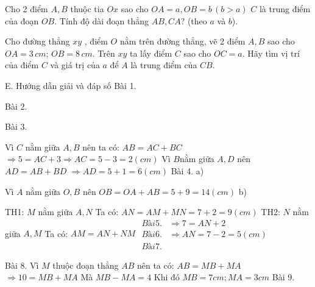\begin{bt}
	Cho 2 điểm $A,B$ thuộc tia  $Ox$  sao cho  $OA=a,OB=b\,(b>a)$ 
	$C$ là trung điểm của đoạn $OB.$  Tính độ dài đoạn thẳng  $AB,CA?$ (theo  $a$  và  $b$).
	\begin{loigiaichuong1}
		
	\end{loigiaichuong1}
\end{bt}
\begin{bt}
	Cho đường thẳng  $xy$ , điểm  $O$  nằm trên đường thẳng, vẽ 2 điểm  $A,B$ sao cho  $OA=3\,cm$; $OB=8\,cm$.  Trên  $xy$  ta lấy điểm  $C$  sao cho  $OC=a$.  Hãy tìm vị trí của điểm  $C$ và giá trị của  $a$  để  $A$  là trung điểm của  $CB$.
	\begin{loigiaichuong1}
		
	\end{loigiaichuong1}
\end{bt}

E. Hướng dẫn giải và đáp số
Bài 1. 



Bài 2. 



Bài 3. 

Vì  $C$ nằm giữa $A,B$ nên ta có: $AB=AC+BC$
$\Rightarrow 5=AC+3\Rightarrow AC=5-3=2\left( cm \right)$
Vì $B$nằm giữa $A,D$ nên $AD=AB+BD$
$\Rightarrow AD=5+1=6\left( cm \right)$
Bài 4. 
a) 

Vì $A$ nằm giữa $O,B$ nên $OB=OA+AB=5+9=14\left( cm \right)$
b)

TH1: $M$ nằm giữa $A,N$
Ta có: $AN=AM+MN=7+2=9\left( cm \right)$
TH2: $N$ nằm giữa $A,M$
Ta có: $AM=AN+NM$
$\begin{align}
	Bài 5.   & \Rightarrow 7=AN+2 \\ 
	Bài 6.  & \Rightarrow AN=7-2=5\left( cm \right) \\ 
	Bài 7. \end{align}$


Bài 8. 
Vì $M$ thuộc đoạn thẳng $AB$ nên ta có: $AB=MB+MA$
$\Rightarrow 10=MB+MA$
Mà $MB-MA=4$
Khi đó $MB=7cm;MA=3cm$
Bài 9. 



